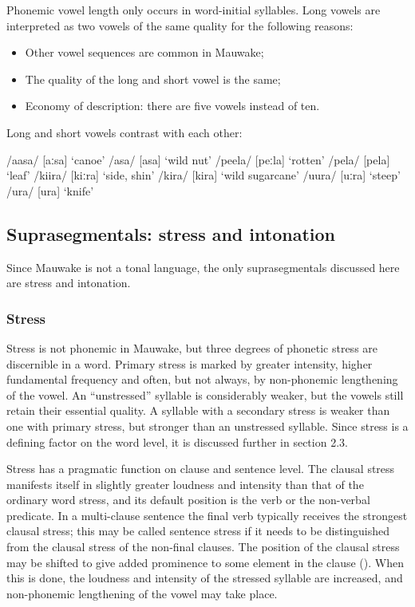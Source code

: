 Phonemic vowel length only occurs in word-initial syllables.  Long vowels are interpreted as two vowels of the same quality for the following reasons:


\begin{itemize}
\item Other vowel sequences are common in Mauwake;
\item The quality of the long and short vowel is the same;
\item Economy of description: there are five vowels instead of ten.
\end{itemize}

Long and short vowels contrast with each other:

\ea
\ea
/aasa/  [{{\textprimstress}aːsa}]  `canoe'
\ex
/asa/  [a{{\textprimstress}sa}]  `wild  nut'
\ex
/peela/  [{{\textprimstress}peːla}]  `rotten'
\ex
/pela/  [pe{{\textprimstress}la}]  `leaf'
\ex
/kiira/  [{{\textprimstress}kiːr}a]  `side, shin'
\ex
/kira/  [ki{{\textprimstress}ra}]  `wild sugarcane'
\ex
/{\textphi}uura/  [{{\textprimstress}}{\textphi}uːra]  `steep'
\ex
/{\textphi}ura/  [{\textphi}u{{\textprimstress}ra}]  `knife'
\z
\z

\subsection{Suprasegmentals: stress and intonation}\label{sec:2:y:x}


Since Mauwake is not a tonal language, the only suprasegmentals discussed here are stress and intonation.

\subsubsection{Stress}\label{sec:2.1.3.1}


Stress is not phonemic in Mauwake, but three degrees of phonetic stress are discernible in a word.  Primary stress is marked by greater intensity, higher fundamental frequency and often, but not always, by non-phonemic lengthening of the vowel.  An ``unstressed'' syllable is considerably weaker, but the vowels still retain their essential quality.  A syllable with a secondary stress is weaker than one with primary stress, but stronger than an unstressed syllable. Since stress is a defining factor on the word level, it is discussed further in section 2.3.

Stress has a pragmatic function on clause and sentence level. The clausal stress manifests itself in slightly greater loudness and intensity than that of the ordinary word stress, and its default position is the verb or the non-verbal predicate. In a multi-clause sentence the final verb typically receives the strongest clausal stress; this may be called sentence stress if it needs to be distinguished from the clausal stress of the non-final clauses. The position of the clausal stress may be shifted to give added prominence to some element in the clause (). When this is done, the loudness and intensity of the stressed syllable are increased, and non-phonemic lengthening of the vowel may take place.

